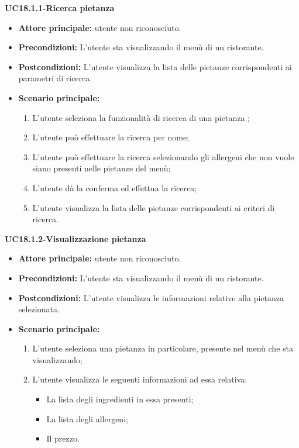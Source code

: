 \textbf{UC18.1.1-Ricerca pietanza}
\begin{itemize}
\item \textbf{Attore principale:} utente non riconosciuto.
\item \textbf{Precondizioni:} L'utente sta visualizzando il menù di un ristorante.
\item \textbf{Postcondizioni:} L'utente visualizza la lista delle pietanze corrispondenti ai parametri di ricerca.
\item \textbf{Scenario principale:}
\begin{enumerate}
    \item L'utente seleziona la funzionalità di ricerca di una pietanza ;
    \item L'utente può effettuare la ricerca per nome;
    \item L'utente può effettuare la ricerca selezionando gli allergeni che non vuole 
    siano presenti nelle pietanze del menù;
    \item L'utente dà la conferma ed effettua la ricerca;
    \item L'utente visualizza la lista delle pietanze corrispondenti ai criteri di ricerca.
\end{enumerate}
\end{itemize}



\textbf{UC18.1.2-Visualizzazione pietanza}
\begin{itemize}
\item \textbf{Attore principale:} utente non riconosciuto.
\item \textbf{Precondizioni:} L'utente sta visualizzando il menù di un ristorante.
\item \textbf{Postcondizioni:} L'utente visualizza le informazioni relative alla pietanza selezionata.
\item \textbf{Scenario principale:}
\begin{enumerate}
    \item L'utente seleziona una pietanza in particolare, presente nel menù che sta visualizzando;
    \item L'utente visualizza le seguenti informazioni ad essa relativa:
    \begin{itemize}
        \item La lista degli ingredienti in essa presenti;
        \item La lista degli allergeni;
        \item Il prezzo.
    \end{itemize}
\end{enumerate}
\end{itemize}
